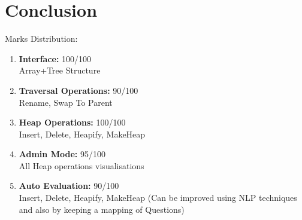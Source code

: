 \documentclass[aps,letterpaper,12pt]{revtex4}
\begin{document}
\newpage
\section{Conclusion}
Marks Distribution:
\begin{enumerate}
\item \textbf{Interface:}                             100/100\\
		Array+Tree Structure
\item \textbf{Traversal Operations:}                  90/100\\
		Rename, Swap To Parent
\item \textbf{Heap Operations:}                       100/100\\
		Insert, Delete, Heapify, MakeHeap
\item \textbf{Admin Mode:}                            95/100\\
		All Heap operations visualisations
\item \textbf{Auto Evaluation:}                        90/100\\
		Insert, Delete, Heapify, MakeHeap (Can be improved using NLP techniques and also by keeping a mapping of Questions)\\	
\end{enumerate}
\end{document}
